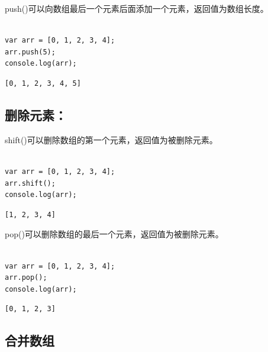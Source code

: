 push()可以向数组最后一个元素后面添加一个元素，返回值为数组长度。 \\

 \\

\begin{lstlisting}[style=htmlcssjs]
var arr = [0, 1, 2, 3, 4];
arr.push(5);
console.log(arr);
\end{lstlisting}

\begin{tcolorbox}
	\begin{verbatim}
[0, 1, 2, 3, 4, 5]
	\end{verbatim}
\end{tcolorbox}

\subsection{删除元素：}

shift()可以删除数组的第一个元素，返回值为被删除元素。 \\

 \\

\begin{lstlisting}[style=htmlcssjs]
var arr = [0, 1, 2, 3, 4];
arr.shift();
console.log(arr);
\end{lstlisting}

\begin{tcolorbox}
	\begin{verbatim}
[1, 2, 3, 4]
	\end{verbatim}
\end{tcolorbox}

pop()可以删除数组的最后一个元素，返回值为被删除元素。 \\

 \\

\begin{lstlisting}[style=htmlcssjs]
var arr = [0, 1, 2, 3, 4];
arr.pop();
console.log(arr);
\end{lstlisting}

\begin{tcolorbox}
	\begin{verbatim}
[0, 1, 2, 3]
	\end{verbatim}
\end{tcolorbox}

\subsection{合并数组}


